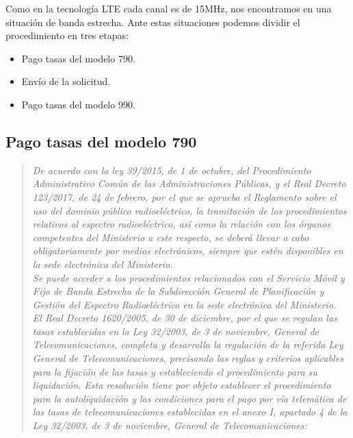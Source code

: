 Como en la tecnología LTE cada canal es de 15MHz, nos encontramos en una situación de banda estrecha. Ante estas situaciones podemos dividir el procedimiento en tres etapas:
\begin{itemize}
\item Pago tasas del modelo 790.
\item Envío de la solicitud.
\item Pago tasas del modelo 990.
\end{itemize}

\subsection{Pago tasas del modelo 790}

\begin{quote}
\itshape
De acuerdo con la ley 39/2015, de 1 de octubre, del Procedimiento Administrativo Común de las Administraciones Públicas, y el Real Decreto 123/2017, de 24 de febrero, por el que se aprueba el Reglamento sobre el uso del dominio público radioeléctrico, la tramitación de los procedimientos relativos al espectro radioeléctrico, así como la relación con los órganos competentes del Ministerio a este respecto, se deberá llevar a cabo obligatoriamente por medios electrónicos, siempre que estén disponibles en la sede electrónica del Ministerio.\\
Se puede acceder a los procedimientos relacionados con el Servicio Móvil y Fijo de Banda Estrecha de la Subdirección General de Planificación y Gestión del Espectro Radioeléctrico en la sede electrónica del Ministerio.\\

El Real Decreto 1620/2005, de 30 de diciembre, por el que se regulan las tasas establecidas en la Ley 32/2003, de 3 de noviembre, General de Telecomunicaciones, completa y desarrolla la regulación de la referida Ley General de Telecomunicaciones, precisando las reglas y criterios aplicables para la fijación de las tasas y estableciendo el procedimiento para su liquidación. Esta resolución tiene por objeto establecer el procedimiento para la autoliquidación y las condiciones para el pago por vía telemática de las tasas de telecomunicaciones establecidas en el anexo I, apartado 4 de la Ley 32/2003, de 3 de noviembre, General de Telecomunicaciones:
\end{quote}


